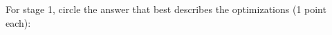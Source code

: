 \documentclass[11pt]{article} %
\begin{document}
\begin{enumerate}

\newpage

For stage 1, circle the answer that best describes the optimizations (1 point each):\newline


\end{enumerate}
\end{document}
